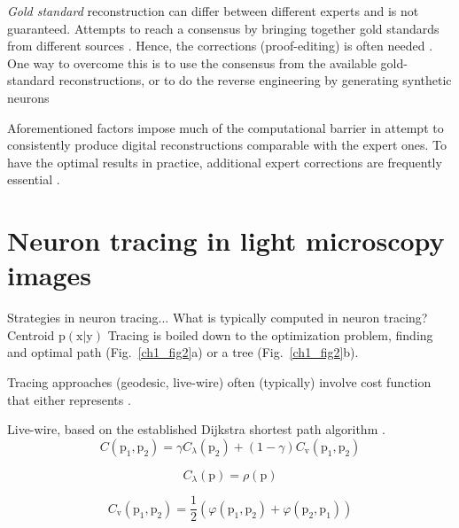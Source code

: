 \textit{Gold standard} reconstruction can differ between different experts and is not guaranteed. Attempts to reach a consensus by bringing together gold standards from different sources \cite{peng2015bigneuron}. Hence, the corrections (proof-editing) is often needed \cite{peng2011proof}. One way to overcome this is to use the consensus from the available gold-standard reconstructions, or to do the reverse engineering by generating synthetic neurons \cite{Koene-2009,radojevic2015fuzzy}

Aforementioned factors impose much of the computational barrier \cite{svoboda2011past} in attempt to consistently produce digital reconstructions comparable with the expert ones. To have the optimal results in practice, additional expert corrections are frequently essential \cite{peng2011proof}. 

\section{Neuron tracing in light microscopy images}
Strategies in neuron tracing...
What is typically computed in neuron tracing? Centroid $\mathrm{p}(\mathrm{x} | \mathrm{y})$ Tracing is boiled down to the optimization problem, finding and optimal path (Fig.~\ref{ch1_fig2}a) or a tree (Fig.~\ref{ch1_fig2}b).


Tracing approaches (geodesic, live-wire) often (typically) involve cost function that either represents .

Live-wire, based on the established Dijkstra shortest path algorithm \cite{dijkstra1959note}.
\begin{equation}
C(\mathrm{p}_1, \mathrm{p}_2) = \gamma C_{\lambda}(\mathrm{p}_2) + (1 - \gamma) C_{\mathrm{v}}(\mathrm{p}_1, \mathrm{p}_2)
\label{ch1_eq2}
\end{equation}

\begin{equation}
C_{\lambda}({\mathrm{p}}) = \rho(\mathrm{p})
\end{equation}

\begin{equation}
C_{\mathrm{v}}(\mathrm{p}_1, \mathrm{p}_2) = \frac{1}{2} \left(  \varphi(\mathrm{p}_1, \mathrm{p}_2) + \varphi(\mathrm{p}_2, \mathrm{p}_1) \right)  
\end{equation}

